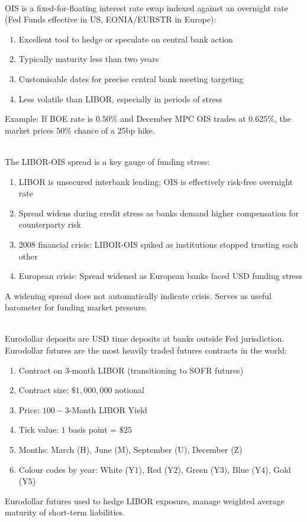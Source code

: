 \documentclass[a4paper,oneside,openany]{book}
\begin{document}
\begin{remark} \\
OIS is a fixed-for-floating interest rate swap indexed against an overnight rate (Fed Funds effective in US, EONIA/EURSTR in Europe):
\begin{enumerate}[label=\roman*.]
\setlength{\itemsep}{0pt}
\item Excellent tool to hedge or speculate on central bank action
\item Typically maturity less than two years
\item Customisable dates for precise central bank meeting targeting
\item Less volatile than LIBOR, especially in periods of stress
\end{enumerate}
Example: If BOE rate is $0.50\%$ and December MPC OIS trades at $0.625\%$, the market prices $50\%$ chance of a $25$bp hike.
\end{remark}

\begin{remark} \\
The LIBOR-OIS spread is a key gauge of funding stress:
\begin{enumerate}[label=\roman*.]
\setlength{\itemsep}{0pt}
\item LIBOR is unsecured interbank lending; OIS is effectively risk-free overnight rate
\item Spread widens during credit stress as banks demand higher compensation for counterparty risk
\item 2008 financial crisis: LIBOR-OIS spiked as institutions stopped trusting each other
\item European crisis: Spread widened as European banks faced USD funding stress
\end{enumerate}
A widening spread does not automatically indicate crisis. Serves as useful barometer for funding market pressure.
\end{remark}

\begin{remark} \\
Eurodollar deposits are USD time deposits at banks outside Fed jurisdiction. Eurodollar futures are the most heavily traded futures contracts in the world:
\begin{enumerate}[label=\roman*.]
\setlength{\itemsep}{0pt}
\item Contract on $3$-month LIBOR (transitioning to SOFR futures)
\item Contract size: $\$1,000,000$ notional
\item Price: $100 - \text{3-Month LIBOR Yield}$
\item Tick value: $1$ basis point = $\$25$
\item Months: March (H), June (M), September (U), December (Z)
\item Colour codes by year: White (Y$1$), Red (Y$2$), Green (Y$3$), Blue (Y$4$), Gold (Y$5$)
\end{enumerate}
Eurodollar futures used to hedge LIBOR exposure, manage weighted average maturity of short-term liabilities.
\end{remark}
\end{document}
